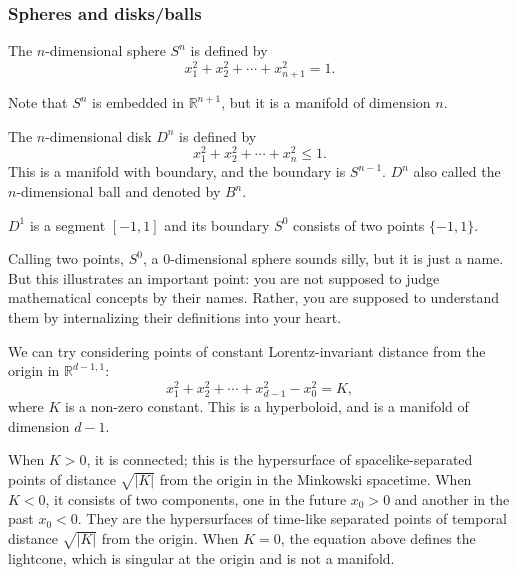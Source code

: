 \documentclass[12pt]{article}
\numberwithin{equation}{section}
\numberwithin{figure}{section}
\theoremstyle{remark}
\def\bR{\mathbb{R}}
\begin{document}
\subsubsection{Spheres and disks/balls}

\begin{example}
The $n$-dimensional sphere $S^n$ is defined by \begin{equation}
  x_1^2+x_2^2+\cdots+x_{n+1}^2=1.
\end{equation} 
\end{example}
Note that $S^n$ is embedded in $\bR^{n+1}$, but it is a manifold of dimension $n$.

\begin{example}
  The $n$-dimensional disk $D^n$ is defined by \begin{equation}
    x_1^2+x_2^2+\cdots+x_{n}^2\le 1.
  \end{equation} 
  This is a manifold with boundary, and the boundary is $S^{n-1}$.
  $D^n$ also called the $n$-dimensional ball and denoted by $B^n$.
\end{example}  

\begin{example}
$D^1$ is a segment $[-1,1]$ and its boundary $S^0$ consists of two points $\{-1,1\}$.
\end{example}

Calling two points, $S^0$, a 0-dimensional sphere sounds silly,
but it is just a name.
But this illustrates an important point:
you are not supposed to judge mathematical concepts by their names.
Rather, you are supposed to understand them by internalizing their definitions into your heart.

\begin{example}
  We can try considering points of constant Lorentz-invariant distance from the origin in $\bR^{d-1,1}$:
\begin{equation}
  x_1^2+x_2^2+\cdots+x_{d-1}^2-x_0^2=K ,
\end{equation}
where $K$ is a non-zero constant. 
This is a hyperboloid, and is a manifold of dimension $d-1$.
\end{example}
When $K>0$, it is connected; this is the hypersurface of spacelike-separated points 
of distance $\sqrt{|K|}$ from the origin
in the Minkowski spacetime.
When $K<0$, it consists of two components, one in the future $x_0>0$ and another in the past $x_0<0$.
They are the hypersurfaces of time-like separated points of temporal distance $\sqrt{|K|}$ from the origin.
When $K=0$, the equation above defines the lightcone, which is singular at the origin and is not a manifold.
\end{document}
